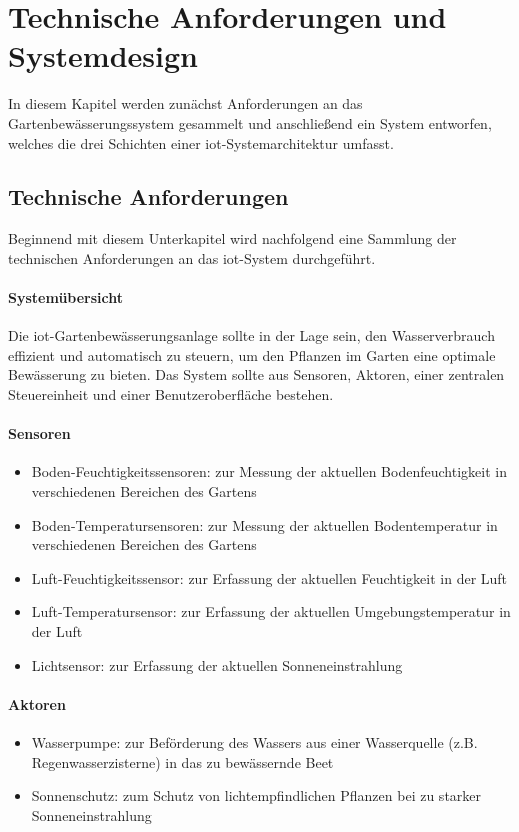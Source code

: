 
\section{Technische Anforderungen und Systemdesign}

In diesem Kapitel werden zunächst Anforderungen an das Gartenbewässerungssystem gesammelt und anschließend ein System entworfen, welches die drei Schichten einer \gls{iot}-Systemarchitektur umfasst.

\subsection{Technische Anforderungen}
Beginnend mit diesem Unterkapitel wird nachfolgend eine Sammlung der technischen Anforderungen an das \gls{iot}-System durchgeführt.

\paragraph{Systemübersicht}
Die \gls{iot}-Gartenbewässerungsanlage sollte in der Lage sein, den Wasserverbrauch effizient und automatisch zu steuern, um den Pflanzen im Garten eine optimale Bewässerung zu bieten. Das System sollte aus Sensoren, Aktoren, einer zentralen Steuereinheit und einer Benutzeroberfläche bestehen.

\paragraph{Sensoren}
\begin{itemize}
  \item Boden-Feuchtigkeitssensoren: zur Messung der aktuellen Bodenfeuchtigkeit in verschiedenen Bereichen des Gartens
  \item Boden-Temperatursensoren: zur Messung der aktuellen Bodentemperatur in verschiedenen Bereichen des Gartens
  \item Luft-Feuchtigkeitssensor: zur Erfassung der aktuellen Feuchtigkeit in der Luft
  \item Luft-Temperatursensor: zur Erfassung der aktuellen Umgebungstemperatur in der Luft
  \item Lichtsensor: zur Erfassung der aktuellen Sonneneinstrahlung
\end{itemize}

\paragraph{Aktoren}
\begin{itemize}
  \item Wasserpumpe: zur Beförderung des Wassers aus einer Wasserquelle (z.B. Regenwasserzisterne) in das zu bewässernde Beet
  \item Sonnenschutz: zum Schutz von lichtempfindlichen Pflanzen bei zu starker Sonneneinstrahlung
\end{itemize}

